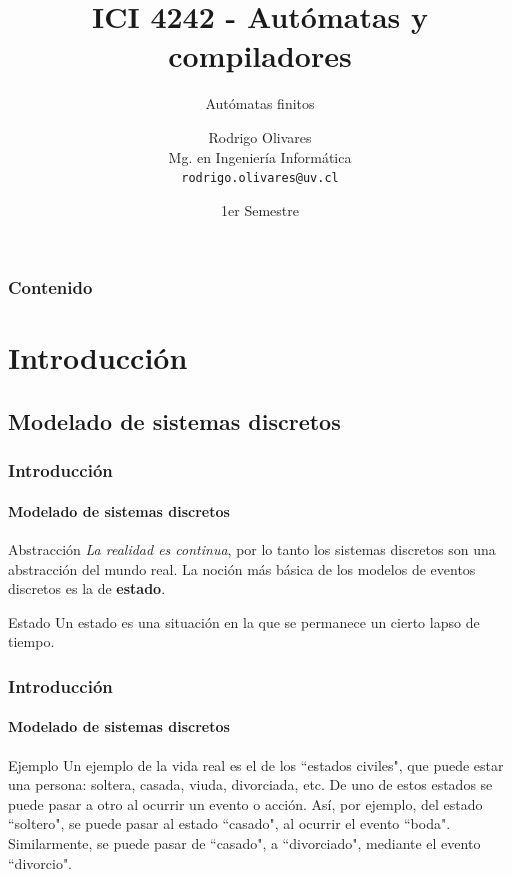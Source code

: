 \documentclass{beamer}
\title[\textbf{ICI 4242 - Aut\'omatas y compiladores}]{\textbf{ICI 4242 - Aut\'omatas y compiladores}}
\subtitle{Aut\'omatas finitos}
\author[Rodrigo Olivares]
{
	Rodrigo Olivares \\
	\vspace{0.5mm}
	Mg. en Ingenier\'ia Inform\'atica \\
	\vspace{0.5mm}
	\texttt{\normalsize rodrigo.olivares@uv.cl}
}
\institute[PUCV]
\date{1er Semestre}
\begin{document}
	\begin{frame}
		\titlepage
	\end{frame}

	\begin{frame}
		\frametitle{Contenido}
		\tableofcontents%
	\end{frame}

	\section{Introducci\'on}

		\subsection{Modelado de sistemas discretos}

		\begin{frame}
			\frametitle{Introducci\'on}
			\framesubtitle{Modelado de sistemas discretos}

			\begin{block}{Abstracci\'on}
			    \emph{La realidad es continua}, por lo tanto los sistemas discretos son una abstracci\'on del mundo real. La noci\'on m\'as b\'asica de los modelos de eventos discretos es la de \textbf{estado}. 
			\end{block}
			\begin{block}{Estado}
			    Un estado es una situaci\'on en la que se permanece un cierto lapso de tiempo. 
			\end{block}
		\end{frame}

		\begin{frame}
			\frametitle{Introducci\'on}
			\framesubtitle{Modelado de sistemas discretos}

			\begin{exampleblock}{Ejemplo}
			    Un ejemplo de la vida real es el de los ``estados civiles", que puede estar una persona: soltera, casada, viuda, divorciada, etc. De uno de estos estados se puede pasar a otro al ocurrir un evento o acci\'on. As\'i, por ejemplo, del estado ``soltero", se puede pasar al estado ``casado", al ocurrir el evento ``boda". Similarmente, se puede pasar de ``casado", a ``divorciado", mediante el evento ``divorcio". 
			\end{exampleblock}
		\end{frame}
\end{document}
